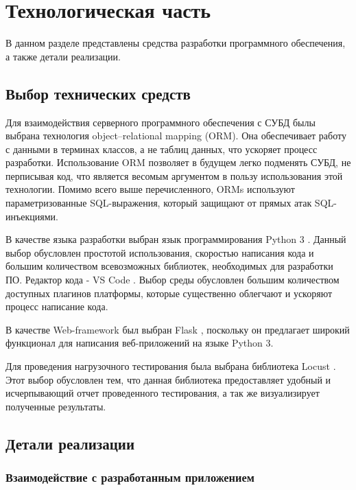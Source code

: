 \chapter{Технологическая часть}

В данном разделе представлены средства разработки программного обеспечения, а также детали реализации.

\section{Выбор технических средств}

Для взаимодействия серверного программного обеспечения с СУБД былы выбрана технология object–relational mapping (ORM). Она обеспечивает работу с данными в терминах классов, а не таблиц данных, что ускоряет процесс разработки. Использование ORM позволяет в будущем легко подменять СУБД, не перписывая код, что является весомым аргументом в пользу использования этой технологии. Помимо всего выше перечисленного, ORMs используют параметризованные SQL-выражения, который защищают от прямых атак SQL-инъекциями.

В качестве языка разработки выбран язык программирования Python 3 \cite{python}. Данный выбор обусловлен простотой использования, скоростью написания кода и большим количеством всевозможных библиотек, необходимых для разработки ПО. Редактор кода - VS Code \cite{vscode}. Выбор среды обусловлен большим количеством доступных плагинов платформы, которые существенно облегчают и ускоряют процесс написание кода.

В качестве Web-framework был выбран Flask \cite{flask}, поскольку он предлагает широкий функционал для написания веб-приложений на языке Python 3.

Для проведения нагрузочного тестирования была выбрана библиотека Locust \cite{locust}. Этот выбор обусловлен тем, что данная библиотека предоставляет удобный и исчерпывающий отчет проведенного тестирования, а так же визуализирует полученные результаты.



\section{Детали реализации}

\subsection{Взаимодействие с разработанным приложением}

